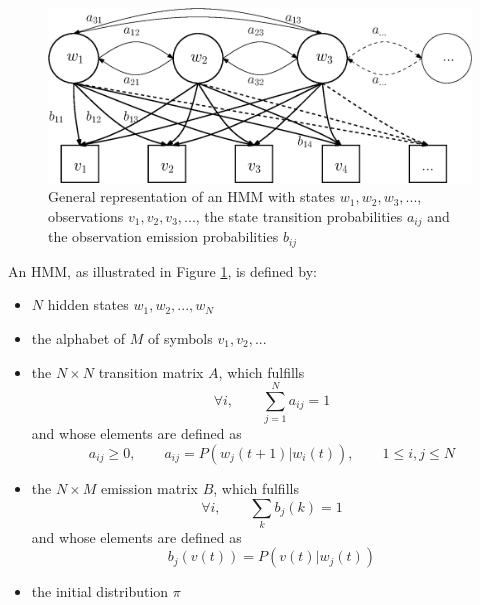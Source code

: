 \documentclass[a4paper, oneside]{csthesis}
\begin{document}
\begin{figure}[tb]
    \begin{center}
        \includegraphics[width=\textwidth]{figures/hmm-general-model.eps}
    \end{center}
    \caption{General representation of an HMM with states $w_1, w_2, w_3, ...$, observations $v_1, v_2, v_3, ...$, the state transition probabilities $a_{ij}$ and the observation emission probabilities $b_{ij}$}
    \label{fig:hmm-general-model}
\end{figure}


An HMM, as illustrated in Figure \ref{fig:hmm-general-model}, is defined by:

\begin{itemize}
 \item $N$ hidden states $w_1, w_2, ..., w_N$
 \item the alphabet of $M$ of symbols $v_1, v_2, ...$
 \item the $N\times N$ transition matrix $A$, which fulfills
 $$\forall i,\qquad \sum_{j=1}^{N} a_{ij} = 1$$
 and whose elements are defined as
 $$a_{ij} \geq 0, \qquad a_{ij} = P(w_j(t+1)|w_i(t)), \qquad 1 \leq i,j \leq N$$

 \item the $N \times M$ emission matrix $B$, which fulfills
 $$\forall i,\qquad \sum_k b_j(k) = 1 $$
 and whose elements are defined as
 $$b_j(v(t)) = P(v(t)|w_j(t))$$

 \item the initial distribution $\pi$
\end{itemize}
\end{document}
